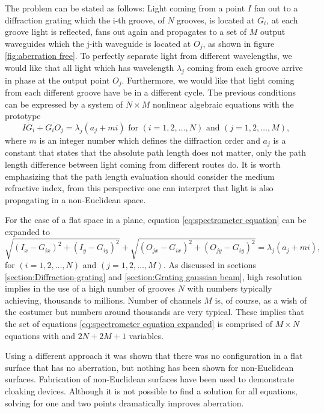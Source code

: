 \documentclass[12pt,twoside,english]{book}
\renewcommand{\~}{\perispomeni}%
\numberwithin{equation}{section}
\numberwithin{figure}{section}
\begin{document}
The problem can be stated as follows: Light coming from a point $I$ fan out to a diffraction grating which the i-th groove, of $N$ grooves, is located at $G_{i}$, at each groove light is reflected, fans out again and propagates to a set of $M$ output waveguides which the j-ith waveguide is located at $O_{j}$, as shown in figure \ref{fig:aberration free}. To perfectly separate light from different wavelengths, we would like that all light which has wavelength $\lambda_{j}$ coming from each groove arrive in phase at the output point $O_{j}$. Furthermore, we would like that light coming from each different groove have be in a different cycle. The previous conditions can be expressed by a system of $N\times M$ nonlinear algebraic equations with the prototype
\begin{equation}
\overline{IG_{i}}+\overline{G_{i}O_{j}}=\lambda_{j}\left(a_{j}+mi\right)\text{ for }\left(i=1,2,\dots,N\right)\text{ and }\left(j=1,2,\dots,M\right),\label{eq:spectrometer equation}\end{equation}
where $m$ is an integer number which defines the diffraction order and $a_{j}$ is a constant that states that the absolute path length does not matter, only the path length difference between light coming from different routes do. It is worth emphasizing that the path length evaluation should consider the medium refractive index, from this perspective one can interpret that light is also propagating in a non-Euclidean space.

For the case of a flat space in a plane, equation \ref{eq:spectrometer equation} can be expanded to
\begin{equation}
\sqrt{\left(I_{x}-G_{ix}\right)^{2}+\left(I_{y}-G_{iy}\right)^{2}}+\sqrt{\left(O_{jx}-G_{ix}\right)^{2}+\left(O_{jy}-G_{iy}\right)^{2}}=\lambda_{j}\left(a_{j}+mi\right),
\label{eq:spectrometer equation expanded}
\end{equation}
for $\left(i=1,2,\dots,N\right)$ and $\left(j=1,2,\dots,M\right)$. As discussed in sections \ref{section:Diffraction-grating} and \ref{section:Grating gaussian beam}, high resolution implies in the use of a high number of grooves $N$ with numbers typically achieving, thousands to millions. Number of channels $M$ is, of course, as a wish of the costumer but numbers around thousands are very typical. These implies that the set of equations \ref{eq:spectrometer equation expanded} is comprised of $M\times N$ equations with and $2N+2M+1$ variables.

Using a different approach it was shown that there was no configuration in a flat surface that has no aberration\cite{Marz:1992p28,Beutler:1945p8,Namioka:1959p48,Velzel:1976p67}, but nothing has been shown for non-Euclidean surfaces. Fabrication of non-Euclidean surfaces have been used to demonstrate cloaking devices\cite{Gabrielli:2009p1173}. Although it is not possible to find a solution for all equations, solving for one and two points dramatically improves aberration. 
\end{document}
